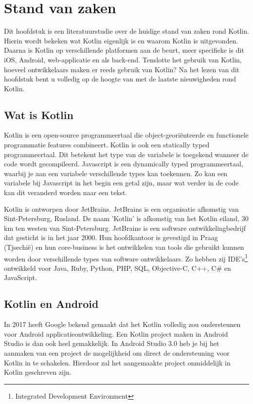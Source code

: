 \chapter{Stand van zaken}
\label{ch:stand-van-zaken}



Dit hoofdstuk is een literatuurstudie over de huidige stand van zaken rond Kotlin. Hierin wordt bekeken wat Kotlin eigenlijk is en waarom Kotlin is uitgevonden. Daarna is Kotlin op verschillende platformen aan de beurt, meer specifieke is dit iOS, Android, web-applicatie en als back-end. Tenslotte het gebruik van Kotlin, hoeveel ontwikkelaars maken er reeds gebruik van Kotlin? Na het lezen van dit hoofdstuk bent u volledig op de hoogte van met de laatste nieuwigheden rond Kotlin.

\section{Wat is Kotlin}
\label{sec:kotlin}
Kotlin is een open-source programmeertaal die object-georiënteerde en functionele programmatie features combineert. Kotlin is ook een statically typed programmeertaal. Dit betekent het type van de variabele is toegekend wanneer de code wordt gecompileerd. 
Javascript is een dynamically typed programmeertaal, waarbij je aan een variabele verschillende types kan toekennen. Zo kan een variabele bij Javascript in het begin een getal zijn, maar wat verder in de code kan dit veranderd worden naar een tekst.

Kotlin is ontworpen door JetBrains. JetBrains is een organisatie afkomstig van Sint-Petersburg, Rusland. De naam 'Kotlin' is afkomstig van het Kotlin eiland, 30 km ten westen van Sint-Petersburg. JetBrains is een software ontwikkelingbedrijf dat gesticht is in het jaar 2000. Hun hoofdkantoor is gevestigd in Praag (Tjsechië) en hun core-business is het ontwikkelen van tools die gebruikt kunnen worden door verschillende types van software ontwikkelaars. Zo hebben zij IDE's\footnote{Integrated Development Environment} ontwikkeld voor Java, Ruby, Python, PHP, SQL, Objective-C, C++, C\# en JavaScript.

\section{Kotlin en Android}
\label{sec:kotlinandroid}
In 2017 heeft Google bekend gemaakt dat het Kotlin volledig zou ondersteunen voor Android applicatieontwikkeling. Een Kotlin project maken in Android Studio is dan ook heel gemakkelijk. In Android Studio 3.0 heb je bij het aanmaken van een project de mogelijkheid om direct de ondersteuning voor Kotlin in te schakelen. Hierdoor zal het aangemaakte project onmiddelijk in Kotlin geschreven zijn.

